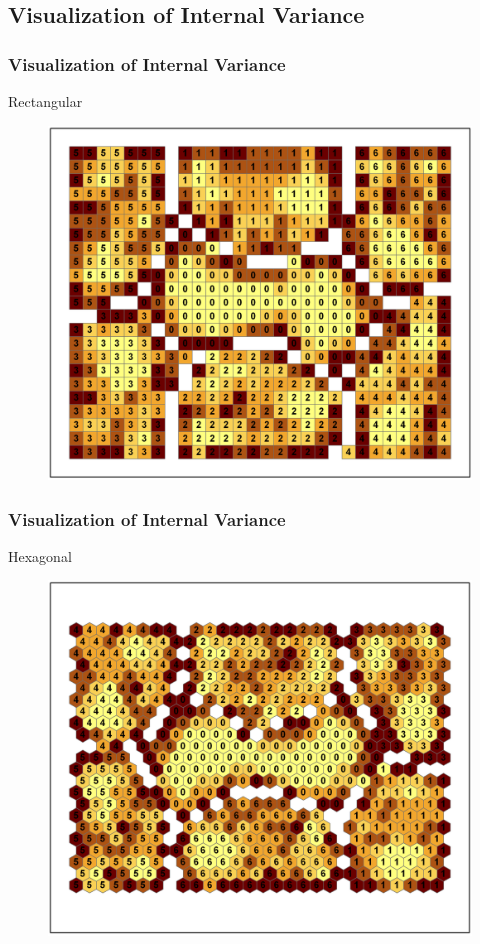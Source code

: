 \documentclass[nototal,handout]{beamer}
\begin{document}
\subsection{Visualization of Internal Variance} 

\begin{frame}
	\frametitle{Visualization of Internal Variance}
 
\begin{block}{Rectangular}
  \begin{center}
  \begin{figure}
  \includegraphics[width=0.70\linewidth]{rook_clusters.png}
  \end{figure}
  \end{center}
 \end{block} \end{frame} 

\begin{frame}
	\frametitle{Visualization of Internal Variance}
 
\begin{block}{Hexagonal}
  \begin{center}
  \begin{figure}
  \includegraphics[width=0.70\linewidth]{hex_clusters.png}
  \end{figure}
  \end{center}
 \end{block} \end{frame} 
\end{document}
